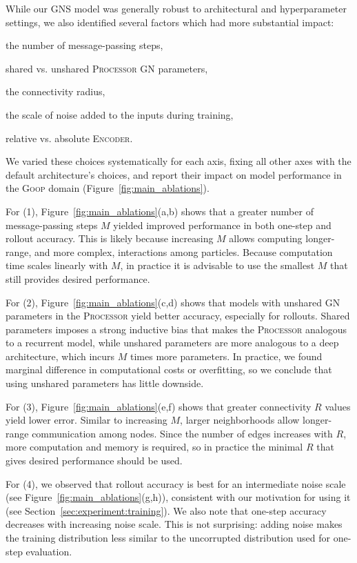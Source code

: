 \documentclass{article}
\newcommand\figref[1]{Figure~\ref{#1}}
\newcommand\domain[1]{\textsc{#1}}
\newcommand{\encoder}{\textsc{Encoder}}
\newcommand{\processor}{\textsc{Processor}}
\newenvironment{enumerate*}%
  {\begin{enumerate}[topsep=-5pt, partopsep=0pt]%
    \setlength{\itemsep}{0pt}%
    \setlength{\parskip}{0pt}%
    \setlength{\parsep}{0pt}}%
  {\end{enumerate}}
\begin{document}
While our GNS model was generally robust to architectural and hyperparameter settings, we also identified several factors which had more substantial impact: 
\begin{enumerate*}
    \item the number of message-passing steps,
    \item shared vs. unshared \processor{} GN parameters,
    \item the connectivity radius, 
    \item the scale of noise added to the inputs during training,
    \item relative vs. absolute \encoder{}.
\end{enumerate*}
We varied these choices systematically for each axis, fixing all other axes with the default architecture's choices, and report their impact on model performance in the \domain{Goop} domain (\figref{fig:main_ablations}).

%
For (1), \figref{fig:main_ablations}(a,b) shows that a greater number of message-passing steps $M$ yielded improved performance in both one-step and rollout accuracy. This is likely because increasing $M$ allows computing longer-range, and more complex, interactions among particles. Because computation time scales linearly with $M$, in practice it is advisable to use the smallest $M$ that still provides desired performance.

For (2), \figref{fig:main_ablations}(c,d) shows that models with unshared GN parameters in the \processor{} yield better accuracy, especially for rollouts. Shared parameters imposes a strong inductive bias that makes the \processor{} analogous to a recurrent model, while unshared parameters are more analogous to a deep architecture, which incurs $M$ times more parameters. In practice, we found marginal difference in computational costs or overfitting, so we conclude that using unshared parameters has little downside.

For (3), \figref{fig:main_ablations}(e,f) shows that greater connectivity $R$ values yield lower error. Similar to increasing $M$, larger neighborhoods allow longer-range communication among nodes. Since the number of edges increases with $R$, more computation and memory is required, so in practice the minimal $R$ that gives desired performance should be used.

For (4), we observed that rollout accuracy is best for an intermediate noise scale (see \figref{fig:main_ablations}(g,h)), consistent with our motivation for using it (see Section~\ref{sec:experiment:training}). We also note that one-step accuracy decreases with increasing noise scale. This is not surprising: adding noise makes the training distribution less similar to the uncorrupted distribution used for one-step evaluation. 
\end{document}
